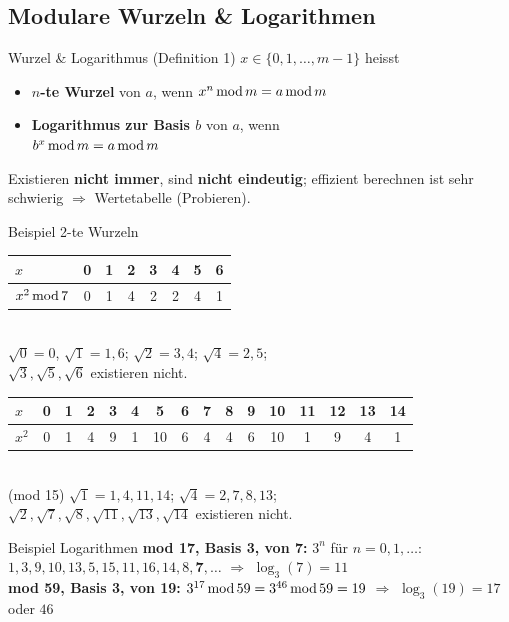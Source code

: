 \documentclass[a4paper, fontsize=7pt]{scrartcl}
\newcommand{\Mod}{\mskip3mu\mathrm{mod}\mskip3mu}
\begin{document}
\subsection{Modulare Wurzeln \& Logarithmen}

\begin{mainbox}{Wurzel \& Logarithmus (Definition 1)}
$x \in \{0, 1, \ldots, m-1\}$ heisst
\begin{itemize}
    \item \textbf{$n$-te Wurzel} von $a$, wenn $x^n \Mod m = a \Mod m$
    \item \textbf{Logarithmus zur Basis $b$} von $a$, wenn\\
          $b^x \Mod m = a \Mod m$
\end{itemize}
Existieren \textbf{nicht immer}, sind \textbf{nicht eindeutig}; effizient
berechnen ist sehr schwierig $\Rightarrow$ Wertetabelle (Probieren).
\end{mainbox}

\begin{subbox}{Beispiel 2-te Wurzeln}
\setlength{\tabcolsep}{2.5pt}
\begin{tabular}{@{}l|ccccccc@{}}
$x$ & 0 & 1 & 2 & 3 & 4 & 5 & 6 \\ \hline
$x^2 \Mod 7$ & 0 & 1 & 4 & 2 & 2 & 4 & 1
\end{tabular}\\[2pt]
$\sqrt{0} = 0$, $\sqrt{1} = 1, 6$; $\sqrt{2} = 3, 4$; $\sqrt{4} = 2, 5$;\\
$\sqrt{3}, \sqrt{5}, \sqrt{6}$ existieren nicht.\\[4pt]
\setlength{\tabcolsep}{1.2pt}
\begin{tabular}{@{}l|ccccccccccccccc@{}}
$x$ & 0 & 1 & 2 & 3 & 4 & 5 & 6 & 7 & 8 & 9 & 10 & 11 & 12 & 13 & 14 \\ \hline
$x^2$ & 0 & 1 & 4 & 9 & 1 & 10 & 6 & 4 & 4 & 6 & 10 & 1 & 9 & 4 & 1
\end{tabular}\\[2pt]
(mod 15) $\sqrt{1} = 1, 4, 11, 14$; $\sqrt{4} = 2, 7, 8, 13$;\\
$\sqrt{2}, \sqrt{7}, \sqrt{8}, \sqrt{11}, \sqrt{13}, \sqrt{14}$ existieren
nicht.
\end{subbox}

\begin{subbox}{Beispiel Logarithmen}
\textbf{mod 17, Basis 3, von 7:} $3^n$ für $n = 0, 1, \ldots$:\\
$1, 3, 9, 10, 13, 5, 15, 11, 16, 14, 8, \mathbf{7}, \ldots$
$\Rightarrow$ $\log_3(7) = 11$\\
\textbf{mod 59, Basis 3, von 19:} $3^{17} \Mod 59 = 3^{46} \Mod 59 = 19$
$\Rightarrow$ $\log_3(19) = 17$ oder $46$
\end{subbox}
\end{document}
